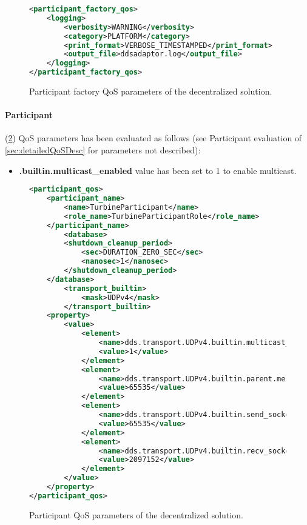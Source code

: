 \begin{figure}[!h]
\begin{lstlisting}[language=XML]
<participant_factory_qos>
	<logging>
		<verbosity>WARNING</verbosity>
		<category>PLATFORM</category>
		<print_format>VERBOSE_TIMESTAMPED</print_format>
		<output_file>ddsadaptor.log</output_file>
	</logging>
</participant_factory_qos>
\end{lstlisting}
\caption[Decentralized participant factory QoS parameters]{
		\label{fig:decParFacQos} 
		\footnotesize{Participant factory QoS parameters of the decentralized solution.}
	}
\end{figure}

\paragraph{Participant} (\cref{fig:decParQos}) QoS parameters has been evaluated as follows (see Participant evaluation of \cref{sec:detailedQoSDesc} for parameters not described):

\begin{itemize}
	\item \textbf{.builtin.multicast\_enabled} value has been set to 1 to enable multicast.
\end{itemize}

\begin{figure}[!h]
\begin{lstlisting}[language=XML]
<participant_qos>
	<participant_name>
		<name>TurbineParticipant</name>
		<role_name>TurbineParticipantRole</role_name>
	</participant_name>
		<database>
		<shutdown_cleanup_period>
			<sec>DURATION_ZERO_SEC</sec>
			<nanosec>1</nanosec>
		</shutdown_cleanup_period>
	</database>
		<transport_builtin>
			<mask>UDPv4</mask>
		</transport_builtin>
	<property>
		<value>
			<element>
				<name>dds.transport.UDPv4.builtin.multicast_enabled</name>
				<value>1</value>
			</element>
			<element>
				<name>dds.transport.UDPv4.builtin.parent.message_size_max</name>
				<value>65535</value>
			</element>
			<element>
				<name>dds.transport.UDPv4.builtin.send_socket_buffer_size </name>
				<value>65535</value>
			</element>
			<element>
				<name>dds.transport.UDPv4.builtin.recv_socket_buffer_size</name>
				<value>2097152</value>
			</element>
		</value>
	</property>
</participant_qos>
\end{lstlisting}
\caption[Decentralized participant QoS parameters]{
		\label{fig:decParQos} 
		\footnotesize{Participant QoS parameters of the decentralized solution.}
	}
\end{figure}

